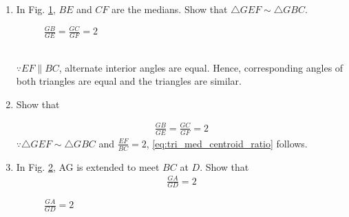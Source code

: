 %
\renewcommand{\theequation}{\theenumi}
\begin{enumerate}[label=\arabic*.,ref=\thesubsection.\theenumi]

\item	In Fig. \ref{fig:tri_med_centroid}, $BE$ and $CF$ are the medians. Show that $\triangle GEF \sim \triangle GBC$.
%
\begin{figure}[!ht]
	\begin{center}
		\resizebox{\columnwidth}{!}{}
	\end{center}
	\caption{$\frac{GB}{GE} = \frac{GC}{GF} = 2$}
	\label{fig:tri_med_centroid}	
\end{figure}
\\
\solution $\because EF \parallel BC$, alternate interior angles are equal.  Hence, corresponding angles of both triangles are equal and the triangles are similar.
\item Show that

	\begin{align}
\label{eq:tri_med_centroid_ratio}
	\frac{GB}{GE} = \frac{GC}{GF} = 2
	\end{align}
%
\solution $\because \triangle GEF \sim \triangle GBC$ and $\frac{EF}{BC} =2$, \eqref{eq:tri_med_centroid_ratio} follows.
%
\item In Fig. \ref{fig:tri_med_meet}, AG is extended to meet $BC$ at $D$.	Show that 
	\begin{align}
\label{eq:tri_med_centroid_ratio_AD}
\frac{GA}{GD} = 2
	\end{align}
\begin{figure}[!ht]
	\begin{center}
		\resizebox{\columnwidth}{!}{}
	\end{center}
	\caption{$\frac{GA}{GD} =2$}
	\label{fig:tri_med_meet}	
\end{figure}


\end{enumerate}
